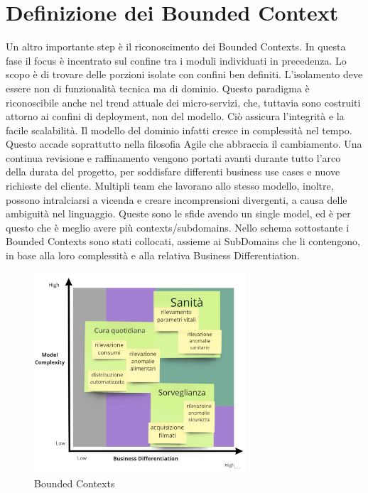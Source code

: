     \section{Definizione dei Bounded Context}
    Un altro importante step è il riconoscimento dei Bounded Contexts. In questa fase il focus è incentrato sul confine tra i moduli individuati in precedenza. Lo scopo è di trovare delle porzioni isolate con confini ben definiti. L’isolamento deve essere non di funzionalità tecnica ma di dominio. Questo paradigma è riconoscibile anche nel trend attuale dei micro-servizi, che, tuttavia sono costruiti attorno ai confini di deployment, non del modello. Ciò assicura l’integrità e la facile scalabilità.
    Il modello del dominio infatti cresce in complessità nel tempo. Questo accade soprattutto nella filosofia Agile che abbraccia il cambiamento. Una continua revisione e raffinamento vengono portati avanti durante tutto l'arco della durata del progetto, per soddisfare differenti business use cases e nuove richieste del cliente. 
    Multipli team che lavorano allo stesso modello, inoltre, possono intralciarsi a vicenda e creare incomprensioni divergenti, a causa delle ambiguità nel linguaggio. 
    Queste sono le sfide avendo un single model, ed è per questo che è meglio avere più contexts/subdomains.
    Nello schema sottostante i Bounded Contexts sono stati collocati, assieme ai SubDomains che li contengono, in base alla loro complessità e alla relativa Business Differentiation. 
    
    \begin{figure}[ht]
        \caption{Bounded Contexts}
        \centering
        \includegraphics[width=0.7\textwidth]{Miro/BoundedContext.jpg}
    \end{figure}
    
